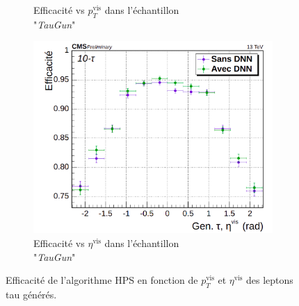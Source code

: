 \begin{figure}[!ht]
\begin{subfigure}{0.5\linewidth}
    \caption{Efficacité vs $p_T^{\text{vis}}$ dans l'échantillon \\ "\textit{TauGun}"} 
  \end{subfigure}
  \begin{subfigure}{0.5\linewidth}
    \centering
    \includegraphics[width=0.8\linewidth]{Chapitre4/Images/HPSnewDMs_10t_eta.png} 
    \caption{Efficacité vs $\eta^{\text{vis}}$ dans l'échantillon \\ "\textit{TauGun}"} 
  \end{subfigure} 
  \caption{Efficacité de l'algorithme HPS en fonction de $p_T^{\text{vis}}$ et $\eta^{\text{vis}}$ des leptons tau générés.}
  \label{TenTaus1}
\end{figure}

